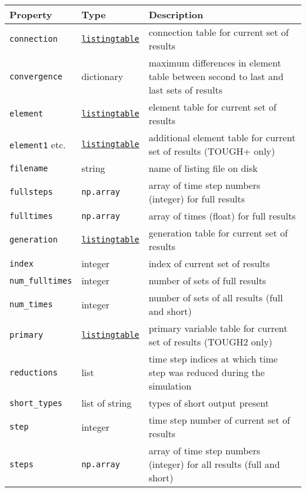 \begin{table}
  \begin{center}
    \begin{tabular}{|l|l|p{70mm}|}
      \hline
      \textbf{Property} & \textbf{Type} & \textbf{Description}\\
      \hline
      \texttt{connection} & \hyperref[listingtableobjects]{\texttt{listingtable}} & connection table for current set of results\\
      \texttt{convergence} & dictionary & maximum differences in element table between second to last and last sets of results\\
      \texttt{element} & \hyperref[listingtableobjects]{\texttt{listingtable}} & element table for current set of results\\
      \texttt{element1} etc. & \hyperref[listingtableobjects]{\texttt{listingtable}} & additional element table for current set of results (TOUGH+ only)\\
      \texttt{filename} & string & name of listing file on disk\\
      \texttt{fullsteps} & \texttt{np.array} & array of time step numbers (integer) for full results\\
      \texttt{fulltimes} & \texttt{np.array} & array of times (float) for full results\\
      \texttt{generation} & \hyperref[listingtableobjects]{\texttt{listingtable}} & generation table for current set of results\\
      \texttt{index} & integer & index of current set of results\\
      \texttt{num\_fulltimes} & integer & number of sets of full results\\
      \texttt{num\_times} & integer & number of sets of all results (full and short)\\
      \texttt{primary} & \hyperref[listingtableobjects]{\texttt{listingtable}} & primary variable table for current set of results (TOUGH2 only)\\
      \texttt{reductions} & list & time step indices at which time step was reduced during the simulation\\
      \texttt{short\_types} & list of string & types of short output present\\
      \texttt{step} & integer & time step number of current set of results\\
      \texttt{steps} & \texttt{np.array} & array of time step numbers (integer) for all results (full and short)\\

\end{tabular}
\end{center}
\end{table}
